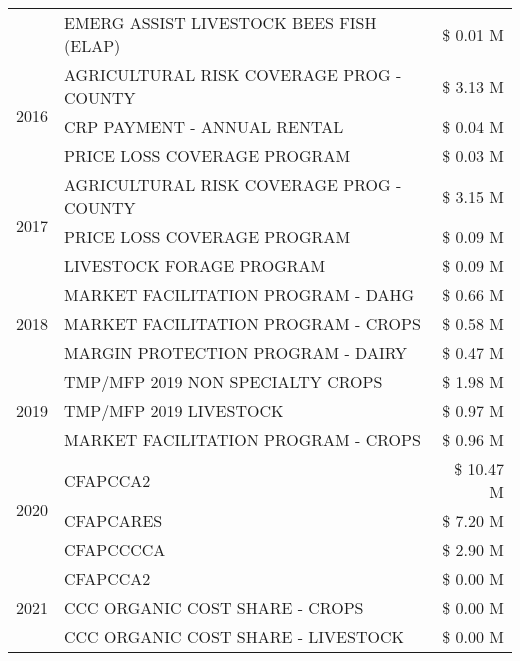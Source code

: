 \begin{tabular}{llr}
 & EMERG ASSIST LIVESTOCK BEES FISH (ELAP) & \$ 0.01 M \\
\cline{1-3}
\multirow[t]{3}{*}{2016} & AGRICULTURAL RISK COVERAGE PROG - COUNTY & \$ 3.13 M \\
 & CRP PAYMENT - ANNUAL RENTAL & \$ 0.04 M \\
 & PRICE LOSS COVERAGE PROGRAM & \$ 0.03 M \\
\cline{1-3}
\multirow[t]{3}{*}{2017} & AGRICULTURAL RISK COVERAGE PROG - COUNTY & \$ 3.15 M \\
 & PRICE LOSS COVERAGE PROGRAM & \$ 0.09 M \\
 & LIVESTOCK FORAGE PROGRAM & \$ 0.09 M \\
\cline{1-3}
\multirow[t]{3}{*}{2018} & MARKET FACILITATION PROGRAM - DAHG & \$ 0.66 M \\
 & MARKET FACILITATION PROGRAM - CROPS & \$ 0.58 M \\
 & MARGIN PROTECTION PROGRAM - DAIRY & \$ 0.47 M \\
\cline{1-3}
\multirow[t]{3}{*}{2019} & TMP/MFP 2019 NON SPECIALTY CROPS & \$ 1.98 M \\
 & TMP/MFP 2019 LIVESTOCK & \$ 0.97 M \\
 & MARKET FACILITATION PROGRAM - CROPS & \$ 0.96 M \\
\cline{1-3}
\multirow[t]{3}{*}{2020} & CFAPCCA2 & \$ 10.47 M \\
 & CFAPCARES & \$ 7.20 M \\
 & CFAPCCCCA & \$ 2.90 M \\
\cline{1-3}
\multirow[t]{3}{*}{2021} & CFAPCCA2 & \$ 0.00 M \\
 & CCC ORGANIC COST SHARE - CROPS & \$ 0.00 M \\
 & CCC ORGANIC COST SHARE - LIVESTOCK & \$ 0.00 M \\
\cline{1-3}
\bottomrule
\end{tabular}
